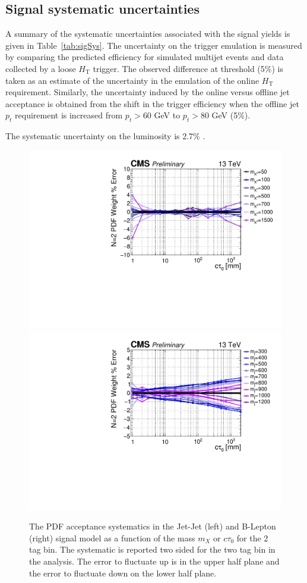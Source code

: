 \subsection{Signal systematic uncertainties}
\label{sec:sigsys}
A summary of the systematic uncertainties associated with the signal
yields is given in Table~\ref{tab:sigSys}.  The uncertainty on the
trigger emulation is measured by comparing the predicted efficiency
for simulated multijet events and data collected by a loose
$H_{\textrm{T}}$ trigger. The observed difference at threshold (5\%)
is taken as an estimate of the uncertainty in the emulation of the
online $H_{\textrm{T}}$ requirement.  Similarly, the uncertainty
induced by the online versus offline jet acceptance is obtained from
the shift in the trigger efficiency when the offline jet $p_{t}$
requirement is increased from $p_{t}>60$ GeV to $p_{t}>80$ GeV (5\%).

The systematic uncertainty on the luminosity is 2.7\% \cite{LUMI}.


\begin{figure}
\begin{center}
\includegraphics[width=.45\textwidth]{figures/an/SYSTEMATICS/76x_pu/sys_2tag_pdf.pdf}
\includegraphics[width=.45\textwidth]{figures/an/SYSTEMATICS/76x_pu/sys_2tag_pdf_dsusy.pdf}
\caption{The PDF acceptance  systematics in the Jet-Jet (left)
 and B-Lepton (right) signal model as a function of the mass $m_X$ 
or $c\tau_0$ for the 2 tag bin. The systematic is reported two sided 
for the two tag bin in the analysis. The error to fluctuate up is in
 the upper half plane and the error to fluctuate down on the lower half plane.  \label{fig:pdf_sys}}
\end{center}
\end{figure}

